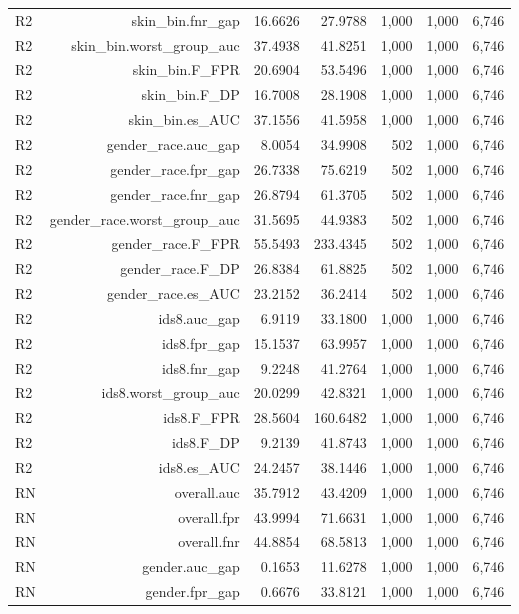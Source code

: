 \documentclass[10pt]{article}
\begin{document}
\begin{longtable}{@{}lrrrrrr@{}}
R2 & skin\_bin.fnr\_gap & 16.6626 & 27.9788 & 1,000 & 1,000 & 6,746 \\
R2 & skin\_bin.worst\_group\_auc & 37.4938 & 41.8251 & 1,000 & 1,000 & 6,746 \\
R2 & skin\_bin.F\_FPR & 20.6904 & 53.5496 & 1,000 & 1,000 & 6,746 \\
R2 & skin\_bin.F\_DP & 16.7008 & 28.1908 & 1,000 & 1,000 & 6,746 \\
R2 & skin\_bin.es\_AUC & 37.1556 & 41.5958 & 1,000 & 1,000 & 6,746 \\
R2 & gender\_race.auc\_gap & 8.0054 & 34.9908 & 502 & 1,000 & 6,746 \\
R2 & gender\_race.fpr\_gap & 26.7338 & 75.6219 & 502 & 1,000 & 6,746 \\
R2 & gender\_race.fnr\_gap & 26.8794 & 61.3705 & 502 & 1,000 & 6,746 \\
R2 & gender\_race.worst\_group\_auc & 31.5695 & 44.9383 & 502 & 1,000 & 6,746 \\
R2 & gender\_race.F\_FPR & 55.5493 & 233.4345 & 502 & 1,000 & 6,746 \\
R2 & gender\_race.F\_DP & 26.8384 & 61.8825 & 502 & 1,000 & 6,746 \\
R2 & gender\_race.es\_AUC & 23.2152 & 36.2414 & 502 & 1,000 & 6,746 \\
R2 & ids8.auc\_gap & 6.9119 & 33.1800 & 1,000 & 1,000 & 6,746 \\
R2 & ids8.fpr\_gap & 15.1537 & 63.9957 & 1,000 & 1,000 & 6,746 \\
R2 & ids8.fnr\_gap & 9.2248 & 41.2764 & 1,000 & 1,000 & 6,746 \\
R2 & ids8.worst\_group\_auc & 20.0299 & 42.8321 & 1,000 & 1,000 & 6,746 \\
R2 & ids8.F\_FPR & 28.5604 & 160.6482 & 1,000 & 1,000 & 6,746 \\
R2 & ids8.F\_DP & 9.2139 & 41.8743 & 1,000 & 1,000 & 6,746 \\
R2 & ids8.es\_AUC & 24.2457 & 38.1446 & 1,000 & 1,000 & 6,746 \\
RN & overall.auc & 35.7912 & 43.4209 & 1,000 & 1,000 & 6,746 \\
RN & overall.fpr & 43.9994 & 71.6631 & 1,000 & 1,000 & 6,746 \\
RN & overall.fnr & 44.8854 & 68.5813 & 1,000 & 1,000 & 6,746 \\
RN & gender.auc\_gap & 0.1653 & 11.6278 & 1,000 & 1,000 & 6,746 \\
RN & gender.fpr\_gap & 0.6676 & 33.8121 & 1,000 & 1,000 & 6,746 \\

\end{longtable}
\end{document}
